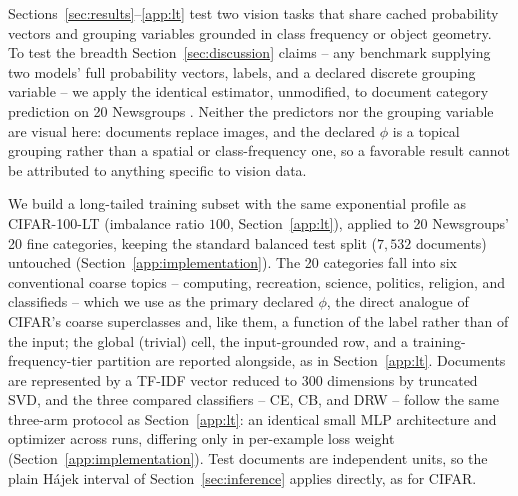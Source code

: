 Sections~\ref{sec:results}--\ref{app:lt} test two vision tasks that share cached
probability vectors and grouping variables grounded in class frequency or object geometry.
To test the breadth Section~\ref{sec:discussion} claims -- any benchmark supplying two
models' full probability vectors, labels, and a declared discrete grouping variable -- we
apply the identical estimator, unmodified, to document category prediction on 20
Newsgroups \citep{lang1995newsweeder}. Neither the predictors nor the grouping variable are
visual here: documents replace images, and the declared $\phi$ is a topical grouping
rather than a spatial or class-frequency one, so a favorable result cannot be attributed
to anything specific to vision data.

We build a long-tailed training subset with the same exponential profile as
CIFAR-100-LT (imbalance ratio $100$, Section~\ref{app:lt}), applied to 20
Newsgroups' 20 fine categories, keeping the standard balanced test split ($7{,}532$
documents) untouched (Section~\ref{app:implementation}). The 20 categories fall into
six conventional coarse topics -- computing, recreation, science, politics, religion,
and classifieds -- which we use as the primary declared $\phi$, the direct analogue of
CIFAR's coarse superclasses and, like them, a function of the label rather than of the
input; the global (trivial) cell, the input-grounded row, and a training-frequency-tier
partition are reported alongside, as in Section~\ref{app:lt}. Documents are represented by a
TF-IDF vector reduced to $300$ dimensions by truncated SVD, and the three compared
classifiers -- CE, CB, and DRW -- follow the same three-arm protocol as
Section~\ref{app:lt}: an identical small MLP architecture and optimizer across runs,
differing only in per-example loss weight (Section~\ref{app:implementation}). Test
documents are independent units, so the plain H\'ajek interval of Section~\ref{sec:inference}
applies directly, as for CIFAR.


